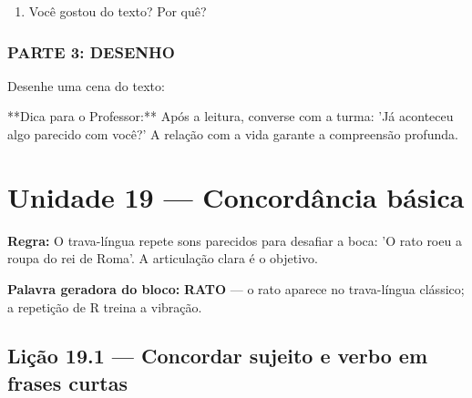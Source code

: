 \begin{exercicio}
\begin{enumerate}
  \item Você gostou do texto? Por quê?
  \begin{center}
  \underline{\hspace{12cm}}
  \end{center}

\end{enumerate}

\subsection*{PARTE 3: DESENHO}

Desenhe uma cena do texto:

\begin{center}
\end{center}

\end{exercicio}

\begin{dica}
**Dica para o Professor:** Após a leitura, converse com a turma: 'Já aconteceu algo parecido com você?' A relação com a vida garante a compreensão profunda.
\end{dica}


\chapter{Unidade 19 --- Concordância básica}


\textbf{Regra:} O trava-língua repete sons parecidos para desafiar a boca: 'O rato roeu a roupa do rei de Roma'. A articulação clara é o objetivo.

\textbf{Palavra geradora do bloco:} \textbf{RATO} --- o rato aparece no trava-língua clássico; a repetição de R treina a vibração.

\section{Lição 19.1 --- Concordar sujeito e verbo em frases curtas}

